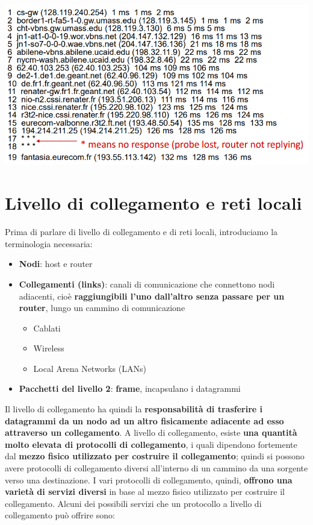 \documentclass[12pt]{article}
\begin{document}
\begin{center}
    \includegraphics[width =0.75\linewidth]{Images/118.png}
\end{center}
\section{Livello di collegamento e reti locali}
Prima di parlare di livello di collegamento e di reti locali, introduciamo la terminologia necessaria:
\begin{itemize}
    \item \textbf{Nodi}: host e router
    \item \textbf{Collegamenti (links)}: canali di comunicazione che connettono nodi adiacenti, cioè \textbf{raggiungibili l'uno dall'altro senza passare per un router}, lungo un cammino di comunicazione
    \begin{itemize}
        \item Cablati
        \item Wireless
        \item Local Arena Networks (LANs)
    \end{itemize}
    \item \textbf{Pacchetti del livello 2}: \textbf{frame}, incapsulano i datagrammi
\end{itemize}
Il livello di collegamento ha quindi la \textbf{responsabilità di trasferire i datagrammi da un nodo ad un altro fisicamente adiacente ad esso attraverso un collegamento}.
A livello di collegamento, esiste \textbf{una quantità molto elevata di protocolli di collegamento}, i quali dipendono fortemente dal \textbf{mezzo fisico utilizzato per costruire il collegamento};
quindi si possono avere protocolli di collegamento diversi all'interno di un cammino da una sorgente verso una destinazione.
I vari protocolli di collegamento, quindi, \textbf{offrono una varietà di servizi diversi} in base al mezzo fisico utilizzato per costruire il collegamento.
Alcuni dei possibili servizi che un protocollo a livello di collegamento può offrire sono:
\end{document}
